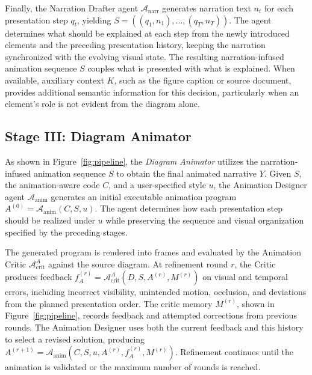 \documentclass{article} %
\begin{document}
Finally, the Narration Drafter agent $\mathcal{A}_{\mathrm{narr}}$ generates narration text $n_t$ for each presentation step $q_t$, yielding $S=((q_1,n_1),\ldots,(q_T,n_T))$. The agent determines what should be explained at each step from the newly introduced elements and the preceding presentation history, keeping the narration synchronized with the evolving visual state. The resulting narration-infused animation sequence $S$ couples what is presented with what is explained. When available, auxiliary context $K$, such as the figure caption or source document, provides additional semantic information for this decision, particularly when an element's role is not evident from the diagram alone.

\subsection{Stage III: Diagram Animator}

As shown in Figure~\ref{fig:pipeline}, the \textit{Diagram Animator} utilizes the narration-infused animation sequence $S$ to obtain the final animated narrative $Y$.  %
Given $S$, the animation-aware code $C$, and a user-specified style $u$, the Animation Designer agent $\mathcal{A}_{\mathrm{anim}}$ generates an initial executable animation program $A^{(0)}=\mathcal{A}_{\mathrm{anim}}(C,S,u)$. The agent determines how each presentation step should be realized under $u$ while preserving the sequence and visual organization specified by the preceding stages.

The generated program is rendered into frames and evaluated by the Animation Critic $\mathcal{A}_{\mathrm{crit}}^{A}$ against the source diagram. At refinement round $r$, the Critic produces feedback $f_A^{(r)}=\mathcal{A}_{\mathrm{crit}}^{A}(D,S,A^{(r)},M^{(r)})$ on visual and temporal errors, including incorrect visibility, unintended motion, occlusion, and deviations from the planned presentation order. The critic memory $M^{(r)}$, shown in Figure~\ref{fig:pipeline}, records feedback and attempted corrections from previous rounds. The Animation Designer uses both the current feedback and this history to select a revised solution, producing $A^{(r+1)}=\mathcal{A}_{\mathrm{anim}}(C,S,u,A^{(r)},f_A^{(r)},M^{(r)})$. Refinement continues until the animation is validated or the maximum number of rounds is reached.
\end{document}
